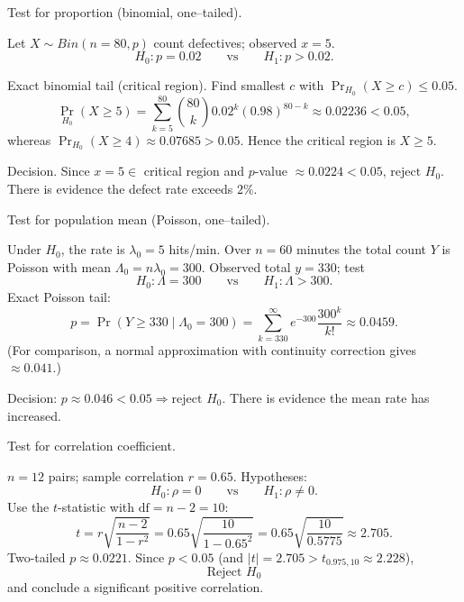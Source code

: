 \documentclass[11pt]{article}
\def\textbf#1{#1}%
\def\mathrm#1{#1}%
\begin{document}

\begin{solution}
\textbf{Test for proportion (binomial, one–tailed).}

Let $X\sim\mathrm{Bin}(n=80,p)$ count defectives; observed $x=5$.
\[
H_0:p=0.02 \qquad\text{vs}\qquad H_1:p>0.02.
\]

\textbf{Exact binomial tail (critical region).}
Find smallest $c$ with $\Pr_{H_0}(X\ge c)\le 0.05$.
\[
\Pr_{H_0}(X\ge 5)=\sum_{k=5}^{80}\binom{80}{k}0.02^k(0.98)^{80-k}\approx \boxed{0.02236}<0.05,
\]
whereas $\Pr_{H_0}(X\ge 4)\approx 0.07685>0.05$. Hence the critical region is $X\ge 5$.

\textbf{Decision.} Since $x=5\in$ critical region and $p$-value $\approx0.0224<0.05$, 
$\boxed{\text{reject }H_0}$. There is evidence the defect rate exceeds $2\%$.
\end{solution}


\begin{solution}
\textbf{Test for population mean (Poisson, one–tailed).}

Under $H_0$, the rate is $\lambda_0=5$ hits/min.
Over $n=60$ minutes the total count $Y$ is Poisson with mean $\Lambda_0=n\lambda_0=300$.
Observed total $y=330$; test
\[
H_0:\Lambda=300 \qquad \text{vs} \qquad H_1:\Lambda>300.
\]
\textbf{Exact Poisson tail:}
\[
p=\Pr(Y\ge 330\mid \Lambda_0=300)=\sum_{k=330}^{\infty} e^{-300}\frac{300^{k}}{k!}\approx \boxed{0.0459}.
\]
(For comparison, a normal approximation with continuity correction gives $\approx 0.041$.)

\textbf{Decision:} $p\approx 0.046<0.05\Rightarrow \boxed{\text{reject }H_0}$.
There is evidence the mean rate has increased.
\end{solution}


\begin{solution}
\textbf{Test for correlation coefficient.}

$n=12$ pairs; sample correlation $r=0.65$. Hypotheses:
\[
H_0:\rho=0 \qquad\text{vs}\qquad H_1:\rho\neq 0.
\]
Use the $t$-statistic with $\text{df}=n-2=10$:
\[
t = r\sqrt{\frac{n-2}{1-r^2}}
= 0.65\sqrt{\frac{10}{1-0.65^2}}
= 0.65\sqrt{\frac{10}{0.5775}}
\approx 2.705.
\]
Two-tailed $p\approx 0.0221$. Since $p<0.05$ (and $|t|=2.705>t_{0.975,10}\approx 2.228$),
\[
\boxed{\text{Reject }H_0}
\]
and conclude a significant positive correlation.
\end{solution}
\end{document}
